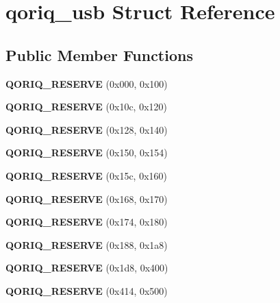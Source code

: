\hypertarget{structqoriq__usb}{}\section{qoriq\+\_\+usb Struct Reference}
\label{structqoriq__usb}
\subsection*{Public Member Functions}
\begin{DoxyCompactItemize}
\item 
\mbox{\label{structqoriq__usb_a3797b6a0492cdaf4cca50b771ebf9437}} 
{\bfseries Q\+O\+R\+I\+Q\+\_\+\+R\+E\+S\+E\+R\+VE} (0x000, 0x100)
\item 
\mbox{\label{structqoriq__usb_a757d07282d7d2501594757dce197a212}} 
{\bfseries Q\+O\+R\+I\+Q\+\_\+\+R\+E\+S\+E\+R\+VE} (0x10c, 0x120)
\item 
\mbox{\label{structqoriq__usb_a4ec990628d813bc83e334cb21b8bcfc7}} 
{\bfseries Q\+O\+R\+I\+Q\+\_\+\+R\+E\+S\+E\+R\+VE} (0x128, 0x140)
\item 
\mbox{\label{structqoriq__usb_a784881227e939b0fadd0c14f24eb95db}} 
{\bfseries Q\+O\+R\+I\+Q\+\_\+\+R\+E\+S\+E\+R\+VE} (0x150, 0x154)
\item 
\mbox{\label{structqoriq__usb_a4101dac855ee443299d917752ad7023e}} 
{\bfseries Q\+O\+R\+I\+Q\+\_\+\+R\+E\+S\+E\+R\+VE} (0x15c, 0x160)
\item 
\mbox{\label{structqoriq__usb_a3fac104bf0b337dd00ab47928096ff47}} 
{\bfseries Q\+O\+R\+I\+Q\+\_\+\+R\+E\+S\+E\+R\+VE} (0x168, 0x170)
\item 
\mbox{\label{structqoriq__usb_acdb64fb4091404459075561a81a69690}} 
{\bfseries Q\+O\+R\+I\+Q\+\_\+\+R\+E\+S\+E\+R\+VE} (0x174, 0x180)
\item 
\mbox{\label{structqoriq__usb_a342f31969edd6184aa8d299f8a65fd4b}} 
{\bfseries Q\+O\+R\+I\+Q\+\_\+\+R\+E\+S\+E\+R\+VE} (0x188, 0x1a8)
\item 
\mbox{\label{structqoriq__usb_a470e24a4ec872e7d584763e96a301d5a}} 
{\bfseries Q\+O\+R\+I\+Q\+\_\+\+R\+E\+S\+E\+R\+VE} (0x1d8, 0x400)
\item 
\mbox{\label{structqoriq__usb_af62beab49fe1a47b679758df615a6d9b}} 
{\bfseries Q\+O\+R\+I\+Q\+\_\+\+R\+E\+S\+E\+R\+VE} (0x414, 0x500)
\end{DoxyCompactItemize}

